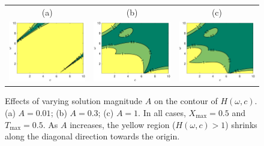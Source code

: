 \documentclass[a4paper,11pt]{article}
\theoremstyle{definition}
\begin{document}
\begin{figure}
\centering
\begin{tabular}{ccc}
(a)&(b)&(c)\\
\includegraphics[width=2in]{Figures/MIPcontour7.eps}&
\includegraphics[width=2in]{Figures/MIPcontour8.eps}&
\includegraphics[width=2in]{Figures/MIPcontour9.eps}
\end{tabular}
\caption{Effects of varying solution magnitude $A$ on the contour of $H(\omega,c)$. (a) $A=0.01$; (b) $A=0.3$; (c) $A=1$.  In all cases, $X_{\max}=0.5$ and $T_{\max}=0.5$. As $A$ increases, the yellow region ($H(\omega,c)>1$) shrinks along the diagonal direction towards the origin.}\label{fig.MIPtest3}
\end{figure}
\end{document}
